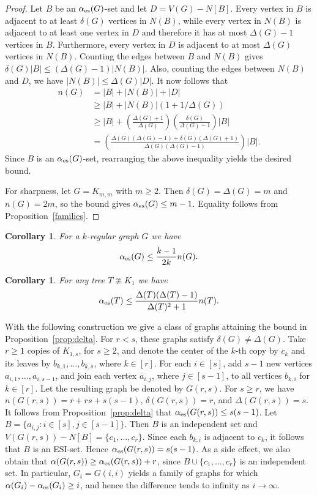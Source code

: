 \documentclass[11pt]{article}
\newtheorem{corollary}[theorem]{Corollary}
\newcommand{\es}{\alpha_{\rm es}}
\begin{document}
\begin{proof}
Let $B$ be an $\es(G)$-set and let $D=V(G)-N[B]$. Every vertex in $B$ is adjacent to at least $\delta(G)$ vertices in $N(B)$, while every vertex in $N(B)$ is adjacent to at least one vertex in $D$ and therefore it has at most $\Delta(G)-1$ vertices in $B$. Furthermore, every vertex in $D$ is adjacent to at most $\Delta(G)$ vertices in $N(B)$. Counting the edges between $B$ and $N(B)$ gives $\delta(G)|B|\leq (\Delta(G)-1)|N(B)|$. Also, counting the edges between $N(B)$ and $D$, we have $|N(B)|\leq \Delta(G)|D|$.
It now follows that 
\begin{align*}
    n(G)&= |B|+|N(B)|+|D|\\
    &\geq |B| +|N(B)|(1+1/\Delta(G))\\
    &\geq |B|+\left (\frac{\Delta(G)+1}{\Delta(G)}\right )\left (\frac{\delta(G)}{\Delta(G)-1}\right )|B|\\
    & = \left (\frac{\Delta(G)(\Delta(G)-1)+\delta(G)(\Delta(G)+1)}{\Delta(G)(\Delta(G)-1)}\right )|B|.
\end{align*}
Since $B$ is an $\es(G)$-set, rearranging the above inequality yields the desired bound.

For sharpness, let $G=K_{m,m}$ with $m\ge 2$. Then $\delta(G)=\Delta(G)=m$ and $n(G)=2m$, so the
bound gives $\es(G)\le m-1$. Equality follows from Proposition~\ref{families}.
\end{proof}

\begin{corollary}
For a $k$-regular graph $G$ we have
\[\es(G) \leq \frac{k-1}{2k}n(G).\]
\end{corollary}


\begin{corollary}
For any tree $T\ncong K_1$ we have
\[\es(T) \leq \frac{\Delta(T)(\Delta(T)-1)}{\Delta(T)^2+1}n(T).\]
\end{corollary}


With the following construction we give a class of graphs attaining the bound in Proposition~\ref{prop:delta}. For $r<s$, these graphs satisfy $\delta(G)\ne \Delta(G)$.
Take $r\ge 1$ copies of $K_{1,s}$, for $s\ge 2$, and denote the center of the $k$-th copy by $c_k$ and its leaves by $b_{k,1},\dots,b_{k,s}$, where $k\in [r]$. 
For each $i\in [s]$, add $s-1$ new vertices $a_{i,1},\dots,a_{i,s-1}$, and join each vertex $a_{i,j}$, where $j\in [s-1]$, to all vertices $b_{k,i}$ for $k\in [r]$. 
Let the resulting graph be denoted by $G(r,s)$.
For $s\ge r$, we have $n(G(r,s))=r+rs+s(s-1)$, $\delta(G(r,s))=r$, and $\Delta(G(r,s))=s$. It follows from Proposition~\ref{prop:delta} that $\es(G(r,s))\le s(s-1)$.
Let $B=\{a_{i,j}: i\in [s], j\in [s-1]\}$. Then $B$ is an independent set and $V(G(r,s))- N[B]=\{c_1,\dots,c_r\}$. Since each $b_{k,i}$ is adjacent to $c_k$, it follows that $B$ is an ESI-set. Hence $\es(G(r,s))=s(s-1)$.
As a side effect, we also obtain that $\alpha(G(r,s))\ge \es(G(r,s))+r$, since $B\cup\{c_1,\dots,c_r\}$ is an independent set. In particular, $G_i=G(i,i)$ yields a family of graphs for which $\alpha(G_i)-\es(G_i)\ge i$, and hence the difference tends to infinity as $i\to\infty$.
\end{document}

